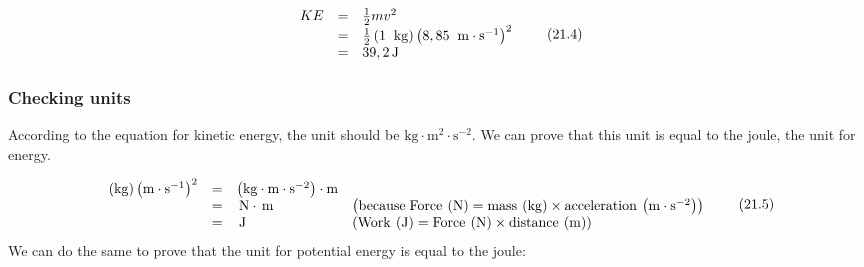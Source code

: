{\begin{mdframed}[linewidth=4, leftmargin=40, rightmargin=40]
\begin{exercise}
\begin{enumerate}[noitemsep, label=\textbf{Step} \textbf{\arabic*}. ]
    \begin{equation}
    \begin{array}{ccc}\hfill KE& =& \frac{1}{2}m{v}^{2}\hfill \\ & =& \frac{1}{2}\left(1\phantom{\rule{4pt}{0ex}}\phantom{\rule{0.166667em}{0ex}}\mathrm{kg}\right){\left(8,85\phantom{\rule{4pt}{0ex}}\phantom{\rule{0.166667em}{0ex}}\mathrm{m}\ensuremath{\cdot}{\mathrm{s}}^{-1}\right)}^{2}\hfill \\ & =& 39,2\phantom{\rule{0.166667em}{0ex}}\mathrm{J}\hfill \end{array}\tag{21.4}
      \end{equation}
      \end{enumerate}
    \end{exercise}
    \end{mdframed}
    }
    \noindent
      \label{m38785*uid65}
            \subsubsection{ Checking units}
            \nopagebreak
        \label{m38785*id67277}According to the equation for kinetic energy, the unit should be $\mathrm{kg}\ensuremath{\cdot}\mathrm{m}{}^{2}\ensuremath{\cdot}\mathrm{s}{}^{-2}$. We can prove that this unit is equal to the joule, the unit for energy.\par 
        \label{m38785*id67329}\nopagebreak\noindent{}
    \begin{equation}
    \begin{array}{cccc}\hfill \left(\mathrm{kg}\right){\left(\mathrm{m}\ensuremath{\cdot}{\mathrm{s}}^{-1}\right)}^{2}& =& \left(\mathrm{kg}\ensuremath{\cdot}\mathrm{m}\ensuremath{\cdot}{\mathrm{s}}^{-2}\right)\ensuremath{\cdot}\mathrm{m}\hfill & \\ & =& \phantom{\rule{0.166667em}{0ex}}\mathrm{N}\ensuremath{\cdot}\phantom{\rule{0.166667em}{0ex}}\mathrm{m}\hfill & \left(\mathrm{because\; Force}\phantom{\rule{2pt}{0ex}}\left(\mathrm{N}\right)=\mathrm{mass}\phantom{\rule{2pt}{0ex}}\left(\mathrm{kg}\right)\ensuremath{\times}\mathrm{acceleration}\phantom{\rule{2pt}{0ex}}\left(\mathrm{m}\ensuremath{\cdot}{\mathrm{s}}^{-2}\right)\right)\hfill \\ & =& \phantom{\rule{0.166667em}{0ex}}\mathrm{J}\hfill & \left(\mathrm{Work}\phantom{\rule{2pt}{0ex}}\left(\mathrm{J}\right)=\mathrm{Force}\phantom{\rule{2pt}{0ex}}\left(\mathrm{N}\right)\ensuremath{\times}\mathrm{distance}\phantom{\rule{2pt}{0ex}}\left(\mathrm{m}\right)\right)\hfill \end{array}\tag{21.5}
      \end{equation}
        \label{m38785*id67613}We can do the same to prove that the unit for potential energy is equal to the joule:\par 
        \label{m38785*id67619}\nopagebreak\noindent{}
          
